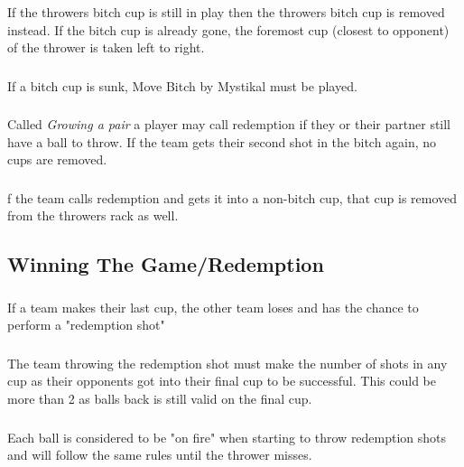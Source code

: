 		\subsubsection{}\label{sssec:BitchCup,rem}
			If the throwers bitch cup is still in play then the throwers bitch cup is removed instead.
            If the bitch cup is already gone, the foremost cup (closest to opponent) of the thrower is taken left to right.
		\subsubsection{}\label{sssec:BitchCup,song}
			If a bitch cup is sunk, Move Bitch by Mystikal must be played.
        \subsubsection{}\label{sssec:BitchCup,redemption}
            Called \emph{Growing a pair} a player may call redemption if they or their partner still have a ball to throw.
            If the team gets their second shot in the bitch again, no cups are removed.
        \subsubsection{}\label{sssec:BitchCup,redemptionFail}
            f the team calls redemption and gets it into a non-bitch cup, that cup is removed from the throwers rack as well.

	\subsection{Winning The Game/Redemption}\label{ssec:Winning}
		\subsubsection{}\label{sssec:Winning,lastcup}
			If a team makes their last cup, the other team loses and has the chance to perform a "redemption shot"
		\subsubsection{}\label{sssec:Winning,redemption}
			The team throwing the redemption shot must make the number of shots in any cup as their opponents got into their final cup to be successful.
            This could be more than 2 as balls back is still valid on the final cup.
		\subsubsection{}\label{sssec:Winning,onfire}
			Each ball is considered to be "on fire" when starting to throw redemption shots and will follow the same rules until the thrower misses.
